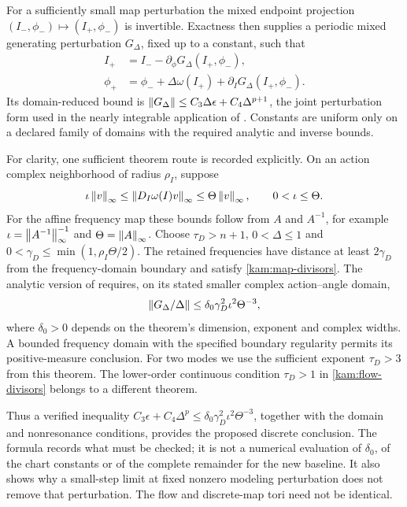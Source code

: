 For a sufficiently small map perturbation the mixed endpoint projection $(I_-,\phi_-)\mapsto(I_+,\phi_-)$ is invertible. Exactness then supplies a periodic mixed generating perturbation $G_\Delta$, fixed up to a constant, such that
\begin{equation}\label{ss:mixed-map}
\begin{aligned}
 I_+&=I_--\partial_\phi G_\Delta(I_+,\phi_-),\\
 \phi_+&=\phi_-+\Delta\omega(I_+)
                   +\partial_I G_\Delta(I_+,\phi_-).
\end{aligned}
\end{equation}
Its domain-reduced bound is
$\left\lVert G_\Delta\right\rVert\le C_3\Delta\epsilon+C_4\Delta^{p+1}$,
the joint perturbation form used in the nearly integrable application of \citet[Section~4]{shang}. Constants are uniform only on a declared family of domains with the required analytic and inverse bounds.

For clarity, one sufficient theorem route is recorded explicitly. On an action complex neighborhood of radius $\rho_I$, suppose
\begin{equation}\label{ss:twist-bounds}
 \iota\left\lVert v\right\rVert_\infty\le\left\lVert D_I\omega(I)v\right\rVert_\infty
                   \le\Theta\left\lVert v\right\rVert_\infty,
 \qquad0<\iota\le\Theta.
\end{equation}
For the affine frequency map these bounds follow from $A$ and $A^{-1}$, for example $\iota=\left\lVert A^{-1}\right\rVert_\infty^{-1}$ and $\Theta=\left\lVert A\right\rVert_\infty$. Choose $\tau_D>n+1$, $0<\Delta\le1$ and
$0<\gamma_D\le\min(1,\rho_I\Theta/2)$.
The retained frequencies have distance at least $2\gamma_D$ from the frequency-domain boundary and satisfy \eqref{kam:map-divisors}. The analytic version of \citet[Theorem~2 and Remark~2]{shang} requires, on its stated smaller complex action--angle domain,
\begin{equation}\label{ss:map-threshold}
 \left\lVert G_\Delta/\Delta\right\rVert
       \le\delta_0\gamma_D^2\iota^2\Theta^{-3},
\end{equation}
where $\delta_0>0$ depends on the theorem's dimension, exponent and complex widths. A bounded frequency domain with the specified boundary regularity permits its positive-measure conclusion. For two modes we use the sufficient exponent $\tau_D>3$ from this theorem. The lower-order continuous condition $\tau_D>1$ in \eqref{kam:flow-divisors} belongs to a different theorem.

Thus a verified inequality
$C_3\epsilon+C_4\Delta^p\le\delta_0\gamma_D^2\iota^2\Theta^{-3}$,
together with the domain and nonresonance conditions, provides the proposed discrete conclusion. The formula records what must be checked; it is not a numerical evaluation of $\delta_0$, of the chart constants or of the complete remainder for the new baseline. It also shows why a small-step limit at fixed nonzero modeling perturbation does not remove that perturbation. The flow and discrete-map tori need not be identical.

